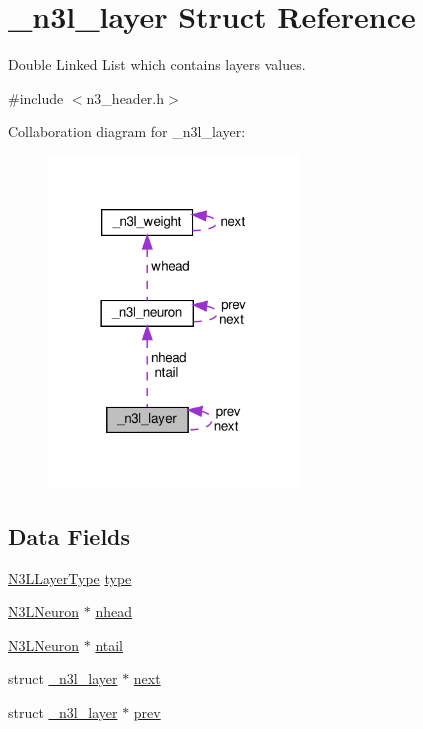 \hypertarget{struct__n3l__layer}{}\section{\+\_\+n3l\+\_\+layer Struct Reference}
\label{struct__n3l__layer}


Double Linked List which contains layer\textquotesingle{}s values.  




{\ttfamily \#include $<$n3\+\_\+header.\+h$>$}



Collaboration diagram for \+\_\+n3l\+\_\+layer\+:\nopagebreak
\begin{figure}[H]
\begin{center}
\leavevmode
\includegraphics[width=189pt]{struct__n3l__layer__coll__graph}
\end{center}
\end{figure}
\subsection*{Data Fields}
\begin{DoxyCompactItemize}
\item 
\hyperlink{n3__header_8h_a1040baea07fec4d26d25641f75e892c5}{N3\+L\+Layer\+Type} \hyperlink{struct__n3l__layer_aec180f7f12ea86bb622c364076dbf1f6}{type}
\item 
\hyperlink{n3__header_8h_a621b1df037f351bd3542298933e5799a}{N3\+L\+Neuron} $\ast$ \hyperlink{struct__n3l__layer_a263e7831428a3b535964412a1d802c4e}{nhead}
\item 
\hyperlink{n3__header_8h_a621b1df037f351bd3542298933e5799a}{N3\+L\+Neuron} $\ast$ \hyperlink{struct__n3l__layer_aa120fe4ab0898e733b8d6940b467ebc3}{ntail}
\item 
struct \hyperlink{struct__n3l__layer}{\+\_\+n3l\+\_\+layer} $\ast$ \hyperlink{struct__n3l__layer_afada0fe8b2a403d5aeeb71b0ae7f8aae}{next}
\item 
struct \hyperlink{struct__n3l__layer}{\+\_\+n3l\+\_\+layer} $\ast$ \hyperlink{struct__n3l__layer_aedfd507c2c60e3b64234b8cd8570e6c9}{prev}
\end{DoxyCompactItemize}


